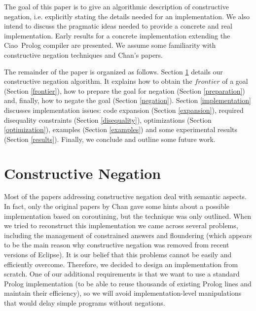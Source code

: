 \documentclass{llncs}
\newcommand{\ciao}{Ciao}
\begin{document}
The goal of this paper is to give an algorithmic description of
constructive negation, i.e. explicitly stating the details needed for
an implementation. We also intend to discuss the pragmatic ideas
needed to provide a concrete and real implementation. Early results
for a concrete implementation extending the \ciao\ Prolog compiler are
presented.  We assume some familiarity with constructive negation
techniques and Chan's papers.

The remainder of the paper is organized as follows. Section
\ref{constructive} details our constructive negation algorithm. It
explains how to obtain the $frontier$ of a goal (Section
\ref{frontier}), how to prepare the goal for negation (Section
\ref{preparation}) and, finally, how to negate the goal (Section
\ref{negation}). Section \ref{implementation} discusses implementation
issues: code expansion (Section \ref{expansion}), required disequality
constraints (Section \ref{disequality}), optimizations (Section
\ref{optimization}), examples (Section \ref{examples}) and some
experimental results (Section \ref{results}).  Finally, we conclude
and outline some future work.
 


\section{Constructive Negation}
\label{constructive}

Most of the papers addressing constructive negation deal with semantic
aspects. In fact, only the original papers by Chan gave some hints
about a possible implementation based on coroutining, but the
technique was only outlined. When we tried to reconstruct this
implementation we came across several problems, including the
management of constrained answers and floundering (which appears to be
the main reason why constructive negation was removed from recent
versions of Eclipse). It is our belief that this problems cannot be
easily and efficiently overcome. Therefore, we decided to design an
implementation from scratch.  One of our additional requirements is
that we want to use a standard Prolog implementation (to be able to
reuse thousands of existing Prolog lines and maintain their
efficiency), so we will avoid implementation-level manipulations that
would delay simple programs without negations.
\end{document}
